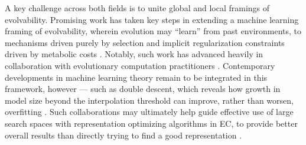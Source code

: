 A key challenge across both fields is to unite global and local framings of evolvability.
Promising work has taken key steps in extending a machine learning framing of evolvability, wherein evolution may ``learn'' from past environments, to mechanisms driven purely by selection and implicit regularization constraints driven by metabolic costs  \citep{kouvaris2017evolution,watson2016how,watson2014evolution}.
Notably, such work has advanced heavily in collaboration with evolutionary computation practitioners \citep{kouvaris2017evolution,szilagyi2020phenotypes,mitchell2025genomic}.
Contemporary developments in machine learning theory remain to be integrated in this framework, however --- such as double descent, which reveals how growth in model size beyond the interpolation threshold can improve, rather than worsen, overfitting \citep{belkin2019reconciling,rocks2022memorizing,nakkiran2021deep}.
Such collaborations may ultimately help guide effective use of large search spaces with representation optimizing algorithms in EC, to provide better overall results than directly trying to find a good representation \citep{hewlett2008optimization,gajewski2019evolvability,mengistu2016evolvability}.
